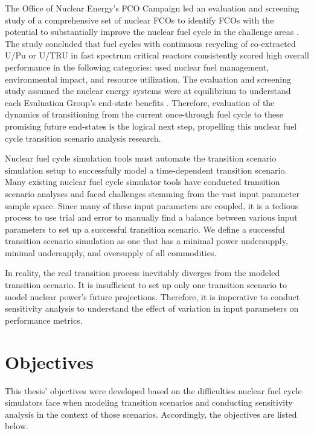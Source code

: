 The Office of Nuclear Energy's
\gls{FCO} Campaign led an evaluation 
and screening study of a comprehensive set of nuclear \glspl{FCO} 
to identify \glspl{FCO} with the potential to substantially 
improve the nuclear fuel cycle in the challenge areas
\cite{wigeland_nuclear_2014}. 
The study concluded that fuel cycles with continuous recycling
of co-extracted U/Pu or U/TRU in fast spectrum critical reactors
consistently scored high overall performance in the following 
categories: used nuclear fuel management, environmental impact, 
and resource utilization. 
The evaluation and screening study assumed
the nuclear energy systems were at equilibrium to understand 
each Evaluation Group's
end-state benefits \cite{feng_standardized_2016}. 
Therefore, evaluation of the dynamics of transitioning from the current 
once-through fuel cycle to these promising 
future end-states \cite{feng_standardized_2016} 
is the logical next step, propelling this
nuclear fuel cycle transition scenario analysis research. 

Nuclear fuel cycle simulation tools must automate the transition scenario simulation 
setup to successfully model a time-dependent transition scenario. 
Many existing nuclear fuel cycle simulator tools have conducted 
transition scenario analyses 
\cite{feng_standardized_2016,bae_standardized_2019,coquelet-pascal_cosi6:_2015}
and faced challenges stemming from the vast input parameter
sample space.
Since many of these input parameters are coupled, it is 
a tedious process to use trial and error to manually find a balance 
between various input parameters to set up a successful transition 
scenario. 
We define a successful transition scenario simulation as one that 
has a minimal power undersupply, minimal undersupply, 
and oversupply of all commodities. 
 
In reality, the real transition process inevitably diverges
from the modeled transition scenario. 
It is insufficient to set up only one transition scenario to model 
nuclear power's future projections.
Therefore, it is imperative to conduct sensitivity analysis to understand 
the effect of variation in input parameters on 
performance metrics. 

\section{Objectives}
This thesis' objectives were developed based on the difficulties 
nuclear fuel cycle simulators face when modeling transition scenarios 
and conducting sensitivity analysis in the context of those scenarios.
Accordingly, the objectives are listed below. 

